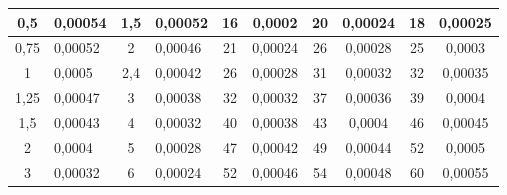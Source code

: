 \documentclass[a4paper, 12pt]{article}
\begin{document}
\begin{enumerate}
\begin{table}[!h]
{\begin{tabular}{|c|l|cl|c|c|c|c|cc}
				{\color[HTML]{000000} 0,5} & {\color[HTML]{000000} 0,00054} & \multicolumn{1}{c|}{{\color[HTML]{000000} 1,5}} & {\color[HTML]{000000} 0,00052} & {\color[HTML]{000000} 16} & {\color[HTML]{000000} 0,0002} & {\color[HTML]{000000} 20} & {\color[HTML]{000000} 0,00024} & \multicolumn{1}{c|}{{\color[HTML]{000000} 18}} & \multicolumn{1}{c|}{{\color[HTML]{000000} 0,00025}} \\ \hline
				{\color[HTML]{000000} 0,75} & {\color[HTML]{000000} 0,00052} & \multicolumn{1}{c|}{{\color[HTML]{000000} 2}} & {\color[HTML]{000000} 0,00046} & {\color[HTML]{000000} 21} & {\color[HTML]{000000} 0,00024} & {\color[HTML]{000000} 26} & {\color[HTML]{000000} 0,00028} & \multicolumn{1}{c|}{{\color[HTML]{000000} 25}} & \multicolumn{1}{c|}{{\color[HTML]{000000} 0,0003}} \\ \hline
				{\color[HTML]{000000} 1} & {\color[HTML]{000000} 0,0005} & \multicolumn{1}{c|}{{\color[HTML]{000000} 2,4}} & {\color[HTML]{000000} 0,00042} & {\color[HTML]{000000} 26} & {\color[HTML]{000000} 0,00028} & {\color[HTML]{000000} 31} & {\color[HTML]{000000} 0,00032} & \multicolumn{1}{c|}{{\color[HTML]{000000} 32}} & \multicolumn{1}{c|}{{\color[HTML]{000000} 0,00035}} \\ \hline
				{\color[HTML]{000000} 1,25} & {\color[HTML]{000000} 0,00047} & \multicolumn{1}{c|}{{\color[HTML]{000000} 3}} & {\color[HTML]{000000} 0,00038} & {\color[HTML]{000000} 32} & {\color[HTML]{000000} 0,00032} & {\color[HTML]{000000} 37} & {\color[HTML]{000000} 0,00036} & \multicolumn{1}{c|}{{\color[HTML]{000000} 39}} & \multicolumn{1}{c|}{{\color[HTML]{000000} 0,0004}} \\ \hline
				{\color[HTML]{000000} 1,5} & {\color[HTML]{000000} 0,00043} & \multicolumn{1}{c|}{{\color[HTML]{000000} 4}} & {\color[HTML]{000000} 0,00032} & {\color[HTML]{000000} 40} & {\color[HTML]{000000} 0,00038} & {\color[HTML]{000000} 43} & {\color[HTML]{000000} 0,0004} & \multicolumn{1}{c|}{{\color[HTML]{000000} 46}} & \multicolumn{1}{c|}{{\color[HTML]{000000} 0,00045}} \\ \hline
				{\color[HTML]{000000} 2} & {\color[HTML]{000000} 0,0004} & \multicolumn{1}{c|}{{\color[HTML]{000000} 5}} & {\color[HTML]{000000} 0,00028} & {\color[HTML]{000000} 47} & {\color[HTML]{000000} 0,00042} & {\color[HTML]{000000} 49} & {\color[HTML]{000000} 0,00044} & \multicolumn{1}{c|}{{\color[HTML]{000000} 52}} & \multicolumn{1}{c|}{{\color[HTML]{000000} 0,0005}} \\ \hline
				{\color[HTML]{000000} 3} & {\color[HTML]{000000} 0,00032} & \multicolumn{1}{c|}{{\color[HTML]{000000} 6}} & {\color[HTML]{000000} 0,00024} & {\color[HTML]{000000} 52} & {\color[HTML]{000000} 0,00046} & {\color[HTML]{000000} 54} & {\color[HTML]{000000} 0,00048} & \multicolumn{1}{c|}{{\color[HTML]{000000} 60}} & \multicolumn{1}{c|}{{\color[HTML]{000000} 0,00055}} \\ \hline

\end{tabular}}
\end{table}
\end{enumerate}
\end{document}
